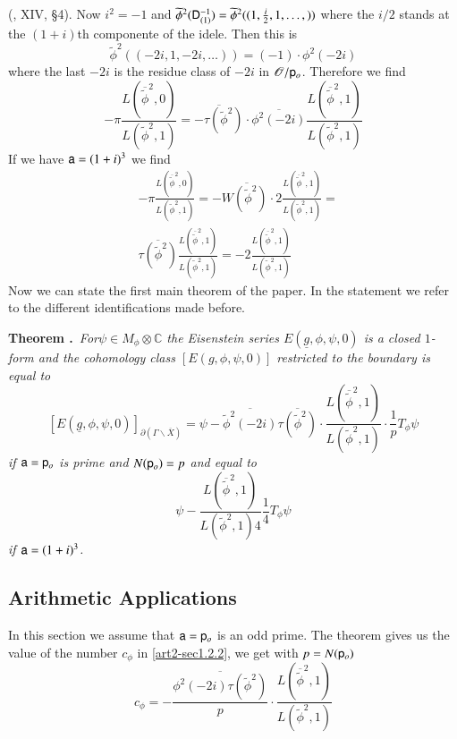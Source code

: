(\cite{art2-key12}, XIV, \S4). Now $i^{2}=-1$ and $\widetilde{\phi}^{2}(\mathsf{D}^{-1}_{(1)})=\widetilde{\phi}^{2}((1,\frac{i}{2},1,\ldots,))$ where the $i/2$ stands at the $(1+i)$th componente of the idele. Then this is
$$
\widetilde{\phi}^{2}((-2i, 1, -2i,\ldots))=(-1)\cdot \phi^{2}(-2i)
$$
where the last $-2i$ is the residue class of $-2i$ in $\mathscr{O}/\mathsf{p}_{o}$. Therefore we find
$$
-\pi \frac{L(\overline{\widetilde{\phi}}^{2},0)}{L(\widetilde{\phi}^{2},1)}=\overline{-\tau(\widetilde{\phi}^{2})}\cdot \overline{\phi^{2}(-2i)} \frac{L(\overline{\widetilde{\phi}}^{2},1)}{L(\widetilde{\phi}^{2},1)}
$$
If we have $\mathsf{a}=(1+i)^{3}$ we find
\begin{align*}
& -\pi \frac{L(\overline{\widetilde{\phi}}^{2},0)}{L(\widetilde{\phi}^{2},1)}=\overline{-W(\widetilde{\phi}^{2})\cdot 2}\frac{L(\overline{\widetilde{\phi}}^{2},1)}{L(\widetilde{\phi}^{2},1)}=\\[4pt]
& \overline{\tau(\widetilde{\phi}^{2})}\frac{L(\overline{\widetilde{\phi}}^{2},1)}{L(\widetilde{\phi}^{2},1)}=-2\frac{L(\overline{\widetilde{\phi}}^{2},1)}{L(\widetilde{\phi}^{2},1)}
\end{align*}
Now we can state the first main theorem of the paper. In the statement we refer to the different identifications made before.

\medskip
\noindent
{\bf Theorem .\label{art2-thm2.1}}~{\em For\pageoriginale $\psi\in M_{\phi}\otimes \mathbb{C}$ the Eisenstein series $E(\underline{g},\phi,\psi,0)$ is a closed $1$-form and the cohomology class $[E(g,\phi,\psi,0)]$ restricted to the boundary is equal to}
$$
[E(\underline{g},\phi,\psi,0)]_{\partial(\Gamma\backslash\overline{X})}=\psi-\overline{\widetilde{\phi}^{2}(-2i)}\overline{\tau(\widetilde{\phi}^{2})}\cdot \frac{L(\overline{\widetilde{\phi}}^{2},1)}{L(\widetilde{\phi}^{2},1)}\cdot \frac{1}{p}T_{\phi}\psi
$$
{\em if $\mathsf{a}=\mathsf{p}_{o}$ is prime and $N(\mathsf{p}_{o})=p$ and equal to}
$$
\psi-\frac{L(\overline{\widetilde{\phi}}^{2},1)}{L(\widetilde{\phi}^{2},1)4}\frac{1}{4}T_{\phi}\psi
$$
{\em if $\mathsf{a}=(1+i)^{3}$.}

\setcounter{subsection}{1}
\subsection{Arithmetic Applications}\label{art2-sec2.2}
In this section we assume that $\mathsf{a}=\mathsf{p}_{o}$ is an odd prime. The theorem gives us the value of the number $c_{\phi}$ in \ref{art2-sec1.2.2}, we get with $p=N(\mathsf{p}_{o})$
\setcounter{equation}{0}
\begin{equation}
c_{\phi}=-\frac{\overline{\phi^{2}(-2i)\tau(\widetilde{\phi}^{2})}}{p}\cdot \frac{L(\overline{\widetilde{\phi}}^{2},1)}{L(\widetilde{\phi}^{2},1)}\label{art2-eq2.2.1}
\end{equation}

